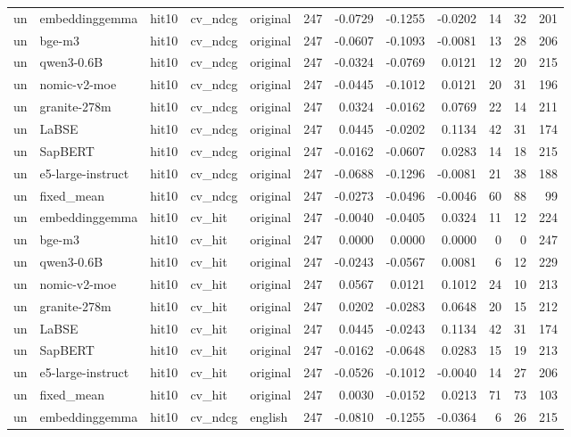 \begin{tabular}{lllllrrrrrrr}
un & embeddinggemma & hit10 & cv\_ndcg & original & 247 & -0.0729 & -0.1255 & -0.0202 & 14 & 32 & 201 \\
un & bge-m3 & hit10 & cv\_ndcg & original & 247 & -0.0607 & -0.1093 & -0.0081 & 13 & 28 & 206 \\
un & qwen3-0.6B & hit10 & cv\_ndcg & original & 247 & -0.0324 & -0.0769 & 0.0121 & 12 & 20 & 215 \\
un & nomic-v2-moe & hit10 & cv\_ndcg & original & 247 & -0.0445 & -0.1012 & 0.0121 & 20 & 31 & 196 \\
un & granite-278m & hit10 & cv\_ndcg & original & 247 & 0.0324 & -0.0162 & 0.0769 & 22 & 14 & 211 \\
un & LaBSE & hit10 & cv\_ndcg & original & 247 & 0.0445 & -0.0202 & 0.1134 & 42 & 31 & 174 \\
un & SapBERT & hit10 & cv\_ndcg & original & 247 & -0.0162 & -0.0607 & 0.0283 & 14 & 18 & 215 \\
un & e5-large-instruct & hit10 & cv\_ndcg & original & 247 & -0.0688 & -0.1296 & -0.0081 & 21 & 38 & 188 \\
un & fixed\_mean & hit10 & cv\_ndcg & original & 247 & -0.0273 & -0.0496 & -0.0046 & 60 & 88 & 99 \\
un & embeddinggemma & hit10 & cv\_hit & original & 247 & -0.0040 & -0.0405 & 0.0324 & 11 & 12 & 224 \\
un & bge-m3 & hit10 & cv\_hit & original & 247 & 0.0000 & 0.0000 & 0.0000 & 0 & 0 & 247 \\
un & qwen3-0.6B & hit10 & cv\_hit & original & 247 & -0.0243 & -0.0567 & 0.0081 & 6 & 12 & 229 \\
un & nomic-v2-moe & hit10 & cv\_hit & original & 247 & 0.0567 & 0.0121 & 0.1012 & 24 & 10 & 213 \\
un & granite-278m & hit10 & cv\_hit & original & 247 & 0.0202 & -0.0283 & 0.0648 & 20 & 15 & 212 \\
un & LaBSE & hit10 & cv\_hit & original & 247 & 0.0445 & -0.0243 & 0.1134 & 42 & 31 & 174 \\
un & SapBERT & hit10 & cv\_hit & original & 247 & -0.0162 & -0.0648 & 0.0283 & 15 & 19 & 213 \\
un & e5-large-instruct & hit10 & cv\_hit & original & 247 & -0.0526 & -0.1012 & -0.0040 & 14 & 27 & 206 \\
un & fixed\_mean & hit10 & cv\_hit & original & 247 & 0.0030 & -0.0152 & 0.0213 & 71 & 73 & 103 \\
un & embeddinggemma & hit10 & cv\_ndcg & english & 247 & -0.0810 & -0.1255 & -0.0364 & 6 & 26 & 215 \\

\end{tabular}
